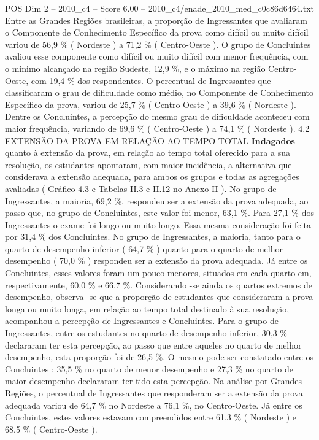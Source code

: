 \begin{textsample}{POS Dim 2 – 2010\_c4 – Score 6.00 – 2010\_c4/enade\_2010\_med\_c0c86d6464.txt}
Entre as Grandes Regiões brasileiras, a proporção de Ingressantes que avaliaram o Componente de Conhecimento Específico da prova como difícil ou muito difícil variou de 56,9 \% ( Nordeste ) a 71,2 \% ( Centro-Oeste ).
O grupo de Concluintes avaliou esse componente como difícil ou muito difícil com menor frequência, com o mínimo alcançado na região Sudeste, 12,9 \%, e o máximo na região Centro-Oeste, com 19,4 \% dos respondentes.
O percentual de Ingressantes que classificaram o grau de dificuldade como médio, no Componente de Conhecimento Específico da prova, variou de 25,7 \% ( Centro-Oeste ) a 39,6 \% ( Nordeste ).
Dentre os Concluintes, a percepção do mesmo grau de dificuldade aconteceu com maior frequência, variando de 69,6 \% ( Centro-Oeste ) a 74,1 \% ( Nordeste ). 4.2 EXTENSÃO DA PROVA EM RELAÇÃO AO TEMPO TOTAL \textbf{Indagados} quanto à extensão da prova, em relação ao tempo total oferecido para a sua resolução, os estudantes apontaram, com maior incidência, a alternativa que considerava a extensão adequada, para ambos os grupos e todas as agregações avaliadas ( Gráfico 4.3 e Tabelas II.3 e II.12 no Anexo II ).
No grupo de Ingressantes, a maioria, 69,2 \%, respondeu ser a extensão da prova adequada, ao passo que, no grupo de Concluintes, este valor foi menor, 63,1 \%.
Para 27,1 \% dos Ingressantes o exame foi longo ou muito longo.
Essa mesma consideração foi feita por 31,4 \% dos Concluintes.
No grupo de Ingressantes, a maioria, tanto para o quarto de desempenho inferior ( 64,7 \% ) quanto para o quarto de melhor desempenho ( 70,0 \% ) respondeu ser a extensão da prova adequada.
Já entre os Concluintes, esses valores foram um pouco menores, situados em cada quarto em, respectivamente, 60,0 \% e 66,7 \%.
Considerando -se ainda os quartos extremos de desempenho, observa -se que a proporção de estudantes que consideraram a prova longa ou muito longa, em relação ao tempo total destinado à sua resolução, acompanhou a percepção de Ingressantes e Concluintes.
Para o grupo de Ingressantes, entre os estudantes no quarto de desempenho inferior, 30,3 \% declararam ter esta percepção, ao passo que entre aqueles no quarto de melhor desempenho, esta proporção foi de 26,5 \%.
O mesmo pode ser constatado entre os Concluintes : 35,5 \% no quarto de menor desempenho e 27,3 \% no quarto de maior desempenho declararam ter tido esta percepção.
Na análise por Grandes Regiões, o percentual de Ingressantes que responderam ser a extensão da prova adequada variou de 64,7 \% no Nordeste a 76,1 \%, no Centro-Oeste.
Já entre os Concluintes, estes valores estavam compreendidos entre 61,3 \% ( Nordeste ) e 68,5 \% ( Centro-Oeste ).

\end{textsample}
